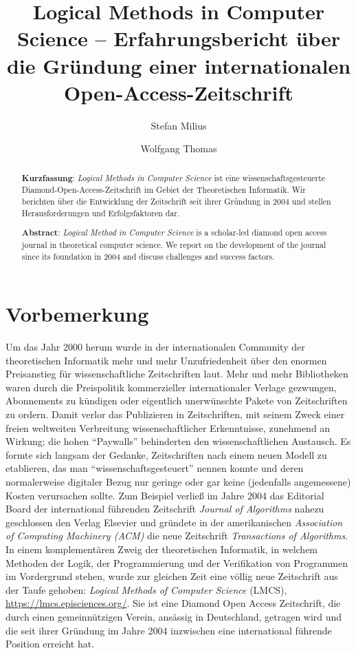 \documentclass[a4paper,
fontsize=11pt,
oneside,
numbers=noperiodatend,
parskip=half-,
bibliography=totoc,
final
]{scrartcl}
\title{\LARGE{Logical Methods in Computer Science -- Erfahrungsbericht über die Gründung einer internationalen Open-Access-Zeitschrift}}%
\author{Stefan Milius \and Wolfgang Thomas} %
\date{}
\begin{document}
\maketitle
\thispagestyle{fancyplain} 

\begin{abstract}
\noindent
\textbf{Kurzfassung}: \emph{Logical Methods in Computer Science} ist
eine wissenschaftsgesteuerte Diamond-Open-Access-Zeitschrift im Gebiet
der Theoretischen Informatik. Wir berichten über die Entwicklung der
Zeitschrift seit ihrer Gründung in 2004 und stellen Herausforderungen
und Erfolgsfaktoren dar.

\textbf{Abstract}: \emph{Logical Method in Computer Science} is a
scholar-led diamond open access journal in theoretical computer science.
We report on the development of the journal since its foundation in 2004
and discuss challenges and success factors.
\end{abstract}

\hypertarget{vorbemerkung}{%
\section{Vorbemerkung}\label{vorbemerkung}}

Um das Jahr 2000 herum wurde in der internationalen Community der
theoretischen Informatik mehr und mehr Unzufriedenheit über den enormen
Preisanstieg für wissenschaftliche Zeitschriften laut. Mehr und mehr
Bibliotheken waren durch die Preispolitik kommerzieller internationaler
Verlage gezwungen, Abonnements zu kündigen oder eigentlich unerwünschte
Pakete von Zeitschriften zu ordern. Damit verlor das Publizieren in
Zeitschriften, mit seinem Zweck einer freien weltweiten Verbreitung
wissenschaftlicher Erkenntnisse, zunehmend an Wirkung; die hohen
\enquote{Paywalls} behinderten den wissenschaftlichen Austausch. Es
formte sich langsam der Gedanke, Zeitschriften nach einem neuen Modell
zu etablieren, das man \enquote{wissenschaftsgesteuert} nennen konnte
und deren normalerweise digitaler Bezug nur geringe oder gar keine
(jedenfalls angemessene) Kosten verursachen sollte. Zum Beispiel verließ
im Jahre 2004 das Editorial Board der international führenden
Zeitschrift \emph{Journal of Algorithms} nahezu geschlossen den Verlag
Elsevier und gründete in der amerikanischen \emph{Association of
Computing Machinery (ACM)} die neue Zeitschrift \emph{Transactions of
Algorithms}. In einem komplementären Zweig der theoretischen Informatik,
in welchem Methoden der Logik, der Programmierung und der Verifikation
von Programmen im Vordergrund stehen, wurde zur gleichen Zeit eine
völlig neue Zeitschrift aus der Taufe gehoben: \emph{Logical Methods of
Computer Science} (LMCS), \url{https://lmcs.episciences.org/}. Sie ist
eine Diamond Open Access Zeitschrift, die durch einen gemeinnützigen
Verein, ansässig in Deutschland, getragen wird und die seit ihrer
Gründung im Jahre 2004 inzwischen eine international führende Position
erreicht hat.
\end{document}
